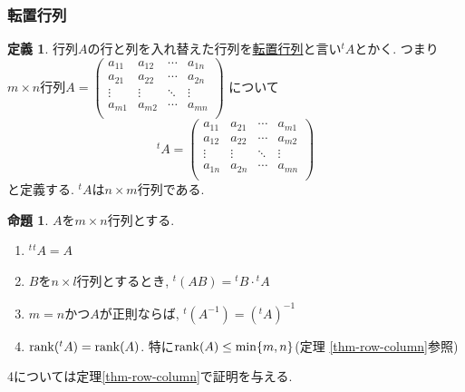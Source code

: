 \documentclass[dvipdfmx,a4paper,11pt]{article}
\theoremstyle{definition}
\newtheorem{prop}[thm]{命題}
\newtheorem{dfn}[thm]{定義}
\begin{document}
\subsubsection{転置行列}
\begin{tcolorbox}[
    colback = white,
    colframe = green!35!black,
    fonttitle = \bfseries,
    breakable = true]
    \begin{dfn}
行列$A$の行と列を入れ替えた行列を\underline{転置行列}と言い${}^{t}A$とかく.
つまり$m \times n$行列$ A=\begin{pmatrix}
a_{11}& a_{12} & \cdots &a_{1n} \\
a_{21}& a_{22} & \cdots &a_{2n} \\
\vdots& \vdots	&	\ddots   &	\vdots \\
a_{m1}& a_{m2} & \cdots &a_{mn} \\
\end{pmatrix}$
について
$$
{}^{t}A
=
\begin{pmatrix}
a_{11}& a_{21} & \cdots &a_{m1} \\
a_{12}& a_{22} & \cdots &a_{m2} \\
\vdots& \vdots	&	\ddots   &	\vdots \\
a_{1n}& a_{2n} & \cdots &a_{mn} \\
\end{pmatrix}
$$
と定義する. ${}^{t}A$は$n \times m$行列である. 
  \end{dfn}
  \end{tcolorbox}
  
  
\begin{tcolorbox}[
    colback = white,
    colframe = green!35!black,
    fonttitle = \bfseries,
    breakable = true]
    \begin{prop}
    $A$を$m \times n$行列とする.
 \begin{enumerate}
   \setlength{\parskip}{0cm} 
  \setlength{\itemsep}{0cm}
  \item ${}^{t}{}^{t}A=A$
  \item $B$を$n \times l$行列とするとき, ${}^{t}(AB)={}^{t}B \cdot {}^{t}A$
  \item $m=n$かつ$A$が正則ならば, ${}^{t}(A^{-1}) = ({}^{t}A)^{-1}$
  \item ${\rm rank}({}^{t}A)={\rm rank}(A)$. 特に${\rm rank}(A) \le \min\{m,n\}$(定理 \ref{thm-row-column}参照)
 \end{enumerate}
  \end{prop}
  \end{tcolorbox}
  4については定理\ref{thm-row-column}で証明を与える. 
\end{document}
